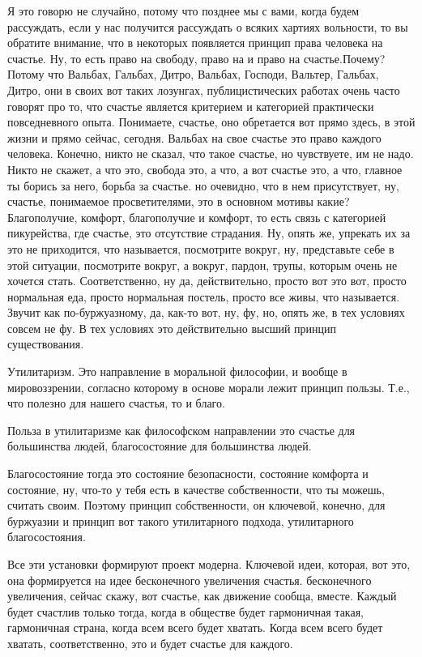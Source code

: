 Я это говорю не случайно, потому что позднее мы с вами, когда
будем рассуждать, если у нас получится рассуждать о всяких хартиях вольности, то
вы обратите внимание, что в некоторых появляется принцип права человека на
счастье. Ну, то есть право на свободу, право на и право на счастье.Почему?
Потому что Вальбах, Гальбах, Дитро, Вальбах, Господи, Вальтер, Гальбах, Дитро,
они в своих вот таких лозунгах, публицистических работах очень часто говорят про
то, что счастье является критерием и категорией практически повседневного опыта.
Понимаете, счастье, оно обретается вот прямо здесь, в этой жизни и прямо сейчас,
сегодня. Вальбах на свое счастье это право каждого человека. Конечно, никто не
сказал, что такое счастье, но чувствуете, им не надо. Никто не скажет, а что
это, свобода это, а что, а вот счастье это, а что, главное ты борись за него,
борьба за счастье. но очевидно, что в нем присутствует, ну, счастье, понимаемое
просветителями, это в основном мотивы какие? Благополучие, комфорт, благополучие
и комфорт, то есть связь с категорией пикурейства, где счастье, это отсутствие
страдания. Ну, опять же, упрекать их за это не приходится, что называется,
посмотрите вокруг, ну, представьте себе в этой ситуации, посмотрите вокруг, а
вокруг, пардон, трупы, которым очень не хочется стать. Соответственно, ну да,
действительно, просто вот это вот, просто нормальная еда, просто нормальная
постель, просто все живы, что называется. Звучит как по-буржуазному, да, как-то
вот, ну, фу, но, опять же, в тех условиях совсем не фу. В тех условиях это
действительно высший принцип существования. 

Утилитаризм.
Это направление в моральной философии, и вообще в
мировоззрении, согласно которому в основе морали лежит принцип пользы. Т.е., что
полезно для нашего счастья, то и благо. 

Польза в утилитаризме как философском
направлении это счастье для большинства людей, благосостояние для большинства
людей. 


Благосостояние тогда это состояние
безопасности, состояние комфорта и состояние, ну, что-то у тебя есть в качестве
собственности, что ты можешь, считать своим. Поэтому принцип собственности, он
ключевой, конечно, для буржуазии и принцип вот такого утилитарного подхода,
утилитарного благосостояния. 

Все эти установки формируют проект модерна.
Ключевой идеи, которая, вот это, она формируется на идее бесконечного увеличения
счастья. бесконечного увеличения, сейчас скажу, вот счастье, как движение
сообща, вместе. Каждый будет счастлив только тогда, когда в обществе будет
гармоничная такая, гармоничная страна, когда всем всего будет хватать. Когда
всем всего будет хватать, соответственно, это и будет счастье для каждого.

